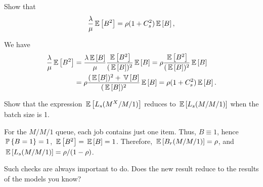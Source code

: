 \begin{question}\label{q:batch}
Show that 
\begin{equation*}
  \frac{\lambda}\mu \E{B^2} = \rho (1+C_s^2)\E B, 
\end{equation*}
  \begin{solution}
We have
\begin{equation*}
  \begin{split}
  \frac{\lambda}\mu \E{B^2} 
&=   \frac{\lambda\E B}{\mu} \frac{\E{B^2}}{(\E B)^2} \E B  = \rho \frac{\E{B^2}}{(\E B)^2} \E B \\
&= \rho \frac{(\E B)^2+\V B}{(\E B)^2}\E B = \rho (1+C_s^2)\E B.
  \end{split}
\end{equation*}
  \end{solution}
\end{question}

\begin{question}
  Show that the expression $\E{L_s(M^X/M/1)}$ reduces to
  $\E{L_s(M/M/1)}$ when the batch size is 1.  
  \begin{solution}
    For the $M/M/1$ queue, each job contains just one item. Thus,
    $B\equiv 1$, hence $\P{B=1}=1$, $\E{B^2}=\E B =1$. Therefore,
    $\E{B_r(M/M/1)}= \rho$, and $\E{L_s(M/M/1)}=\rho/(1-\rho)$. 

      Such checks are always important to do. Does the new result
      reduce to the results of the models you know?
  \end{solution}

\end{question}

